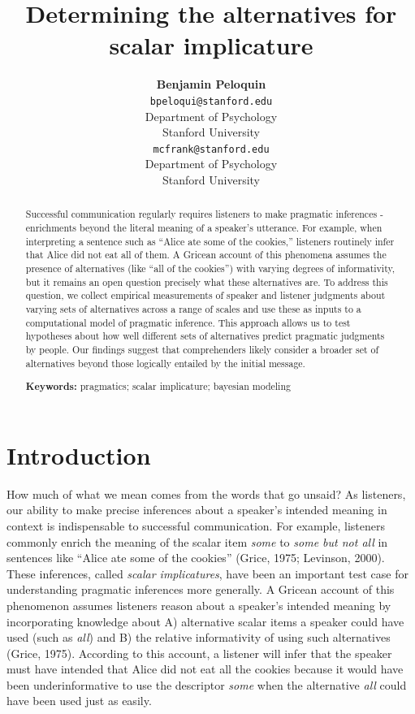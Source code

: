 \documentclass[10pt, letterpaper]{article}
\title{Determining the alternatives for scalar implicature}
\author{{\large \bf Benjamin Peloquin} \\ \texttt{bpeloqui@stanford.edu} \\ Department of Psychology \\ Stanford University \And {\large \bf Michael C. Frank} \\ \texttt{mcfrank@stanford.edu} \\ Department of Psychology \\ Stanford University}
\begin{document}
\maketitle

\begin{abstract}
Successful communication regularly requires listeners to make pragmatic
inferences - enrichments beyond the literal meaning of a speaker's
utterance. For example, when interpreting a sentence such as ``Alice ate
some of the cookies,'' listeners routinely infer that Alice did not eat
all of them. A Gricean account of this phenomena assumes the presence of
alternatives (like ``all of the cookies'') with varying degrees of
informativity, but it remains an open question precisely what these
alternatives are. To address this question, we collect empirical
measurements of speaker and listener judgments about varying sets of
alternatives across a range of scales and use these as inputs to a
computational model of pragmatic inference. This approach allows us to
test hypotheses about how well different sets of alternatives predict
pragmatic judgments by people. Our findings suggest that comprehenders
likely consider a broader set of alternatives beyond those logically
entailed by the initial message.

\textbf{Keywords:}
pragmatics; scalar implicature; bayesian modeling
\end{abstract}

\section{Introduction}\label{introduction}

How much of what we mean comes from the words that go unsaid? As
listeners, our ability to make precise inferences about a speaker's
intended meaning in context is indispensable to successful
communication. For example, listeners commonly enrich the meaning of the
scalar item \emph{some} to \emph{some but not all} in sentences like
``Alice ate some of the cookies'' (Grice, 1975; Levinson, 2000). These
inferences, called \emph{scalar implicatures}, have been an important
test case for understanding pragmatic inferences more generally. A
Gricean account of this phenomenon assumes listeners reason about a
speaker's intended meaning by incorporating knowledge about A)
alternative scalar items a speaker could have used (such as \emph{all})
and B) the relative informativity of using such alternatives (Grice,
1975). According to this account, a listener will infer that the speaker
must have intended that Alice did not eat all the cookies because it
would have been underinformative to use the descriptor \emph{some} when
the alternative \emph{all} could have been used just as easily.
\end{document}
